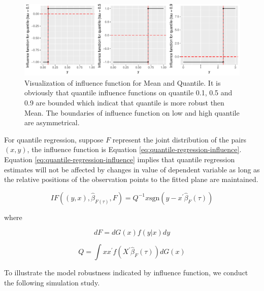 \documentclass[article]{jss}
\theoremstyle{definition}
\theoremstyle{definition}
\theoremstyle{remark}
\begin{document}
\begin{CodeChunk}
\begin{figure}

{\centering \includegraphics{Diagnosing_outliers_and_visualization_of_quantile_regression_models_files/figure-latex/vis-if-1} 

}

\caption[Visualization of influence function for Mean and Quantile]{Visualization of influence function for Mean and Quantile. It is obviously that quantile influence functions on quantile 0.1, 0.5 and 0.9 are bounded which indicat that quantile is more robust then Mean. The boundaries of influence function on low and high quantile are asymmetrical.}\label{fig:vis-if}
\end{figure}
\end{CodeChunk}

For quantile regression, suppose \(F\) represent the joint distribution
of the pairs \((x,y)\), the influence function is Equation
\eqref{eq:quantile-regression-influence}. Equation
\eqref{eq:quantile-regression-influence} implies that quantile regression
estimates will not be affected by changes in value of dependent variable
as long as the relative positions of the observation points to the
fitted plane are maintained.

\begin{equation}
IF((y,x),\hat{\beta}_{F(\tau)},F)=Q^{-1}x\text{sgn}(y-x^{'}\hat{\beta}_{F}(\tau))
\label{eq:quantile-regression-influence}
\end{equation}

where

\begin{equation}
dF=dG(x)f(y|x)dy
\label{eq: dg}
\end{equation}

\begin{equation}
Q=\int xx^{'}f(X^{'}\hat{\beta}_{F}(\tau))dG(x)
\label{eq:q_influence}
\end{equation}

To illustrate the model robustness indicated by influence function, we
conduct the following simulation study.
\end{document}
